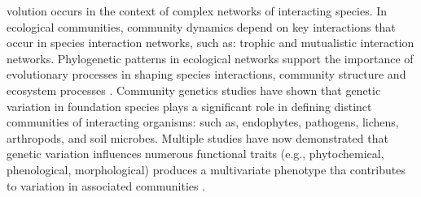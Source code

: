 \documentclass[9pt,twocolumn,twoside,lineno]{pnas-new}
\begin{document}


\maketitle
\thispagestyle{firststyle}




volution occurs in the context of complex networks of
interacting species. In ecological communities, community dynamics
depend on key interactions \cite{Fontaine2011} that occur in species
interaction networks, such as:  trophic \cite{Bascompte2006} and
mutualistic \cite{Rafferty2013} interaction networks. Phylogenetic
patterns in ecological networks support the importance of evolutionary
processes in shaping species interactions, community structure and
ecosystem processes \cite{Crutsinger 2016, Rezende2007,
  Whitham2006a}. Community genetics studies \cite{Lamit et al. 2015}
have shown that genetic variation in foundation species
\cite{Ellison2005} plays a significant role in defining distinct
communities of interacting organisms:  such as, endophytes, pathogens,
lichens, arthropods, and soil microbes. Multiple studies have now
demonstrated that genetic variation influences numerous functional
traits (e.g., phytochemical, phenological, morphological) produces a
multivariate phenotype \cite{holeski2012} tha contributes to variation
in associated communities \cite{Bailey2009a}.
\end{document}
